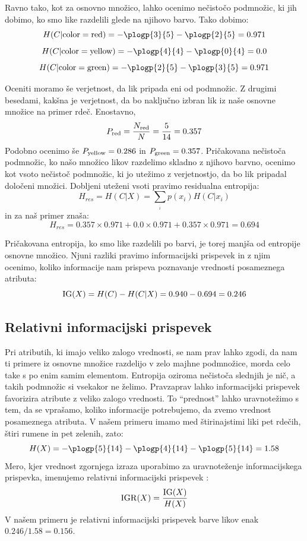 Ravno tako, kot za osnovno množico, lahko ocenimo nečistočo podmnožic, ki jih dobimo, ko smo like razdelili glede na njihovo barvo. Tako dobimo:
%
$$ H(C|{\rm color=red}) = -\plogp{3}{5}-\plogp{2}{5}=0.971 $$
$$ H(C|{\rm color=yellow}) = -\plogp{4}{4}-\plogp{0}{4}=0.0 $$
$$ H(C|{\rm color=green}) = -\plogp{2}{5}-\plogp{3}{5}=0.971 $$

Oceniti moramo še verjetnost, da lik pripada eni od podmnožic. Z drugimi besedami, kakšna je verjetnost, da bo naključno izbran lik iz naše osnovne množice na primer rdeč. Enostavno, 
%
$$ P_{\rm red}={N_{\rm red}\over N} = {5\over 14}=0.357$$
%
Podobno ocenimo še $P_{\rm yellow}=0.286$ in $P_{\rm green}=0.357$. Pričakovana nečistoča podmnožic, ko našo množico likov razdelimo skladno z njihovo barvno, ocenimo kot vsoto nečistoč podmnožic, ki jo utežimo z verjetnostjo, da bo lik pripadal določeni množici. Dobljeni uteženi vsoti pravimo residualna entropija:
%
$$ H_{res}=H(C|X)=\sum_{_i} p(x_i) H(C|x_i)  $$
%
in za naš primer znaša:
$$ H_{res} = 0.357 \times 0.971 + 0.0 \times 0.971 + 0.357 \times 0.971 = 0.694 $$

Pričakovana entropija, ko smo like razdelili po barvi, je torej manjša od entropije osnovne množico. Njuni razliki pravimo informacijski prispevek  in z njim ocenimo, koliko informacije nam prispeva poznavanje vrednosti posameznega atributa:
$$ {\rm IG}(X) = H(C) - H(C|X) = 0.940 - 0.694 = 0.246 $$

\subsection{Relativni informacijski prispevek}

Pri atributih, ki imajo veliko zalogo vrednosti, se nam prav lahko zgodi, da nam ti primere iz osnovne množice razdelijo v zelo majhne podmnožice, morda celo take s po enim samim elementom. Entropija oziroma nečistoča slednjih je nič, a takih podmnožic si vsekakor ne želimo. Pravzaprav lahko informacijski prispevek favorizira atribute z veliko zalogo vrednosti. To ``prednost'' lahko uravnotežimo s tem, da se vprašamo, koliko informacije potrebujemo, da zvemo vrednost posameznega atributa. V našem primeru imamo med štirinajstimi liki pet rdečih, štiri rumene in pet zelenih, zato:
$$ H(X)=-\plogp{5}{14}-\plogp{4}{14}-\plogp{5}{14}=1.58 $$
%
Mero, kjer vrednost zgornjega izraza uporabimo za uravnoteženje informacijskega prispevka, imenujemo relativni informacijski prispevek :
%
$$ {\rm IGR}(X) = {{\rm IG}(X)\over H(X)} $$
V našem primeru je relativni informacijski prispevek barve likov enak $0.246/1.58=0.156$.

